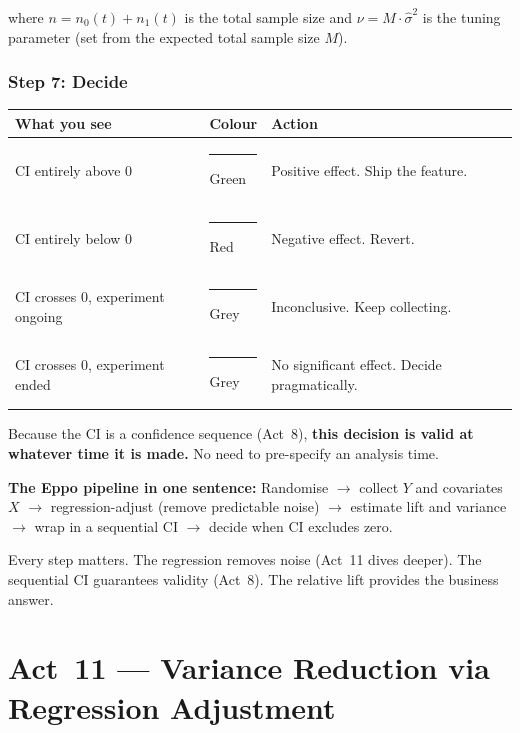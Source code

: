 \documentclass[12pt, a4paper]{article}
\begin{document}
where $n = n_0(t) + n_1(t)$ is the total sample size and $\nu = M \cdot
\hat{\sigma}^2$ is the tuning parameter (set from the expected total sample
size $M$).

\subsubsection*{Step 7: Decide}

\begin{center}
\renewcommand{\arraystretch}{1.3}
\begin{tabular}{@{} l l p{6.5cm} @{}}
\toprule
\textbf{What you see} & \textbf{Colour} & \textbf{Action} \\
\midrule
CI entirely above 0
  & \textcolor{green!60!black}{\rule{1em}{1em}} Green
  & Positive effect.  Ship the feature. \\
CI entirely below 0
  & \textcolor{red}{\rule{1em}{1em}} Red
  & Negative effect.  Revert. \\
CI crosses 0, experiment ongoing
  & \textcolor{gray}{\rule{1em}{1em}} Grey
  & Inconclusive.  Keep collecting. \\
CI crosses 0, experiment ended
  & \textcolor{gray}{\rule{1em}{1em}} Grey
  & No significant effect.  Decide pragmatically. \\
\bottomrule
\end{tabular}
\end{center}

Because the CI is a confidence sequence (Act~8), \textbf{this decision is
valid at whatever time it is made.}  No need to pre-specify an analysis time.

\begin{keytakeaway}
\textbf{The Eppo pipeline in one sentence:}
Randomise $\to$ collect $Y$ and covariates $X$ $\to$ regression-adjust
(remove predictable noise) $\to$ estimate lift and variance $\to$ wrap in
a sequential CI $\to$ decide when CI excludes zero.

Every step matters.  The regression removes noise (Act~11 dives deeper).
The sequential CI guarantees validity (Act~8).  The relative lift provides
the business answer.
\end{keytakeaway}


\newpage
\section{Act~11 --- Variance Reduction via Regression Adjustment}
\end{document}
